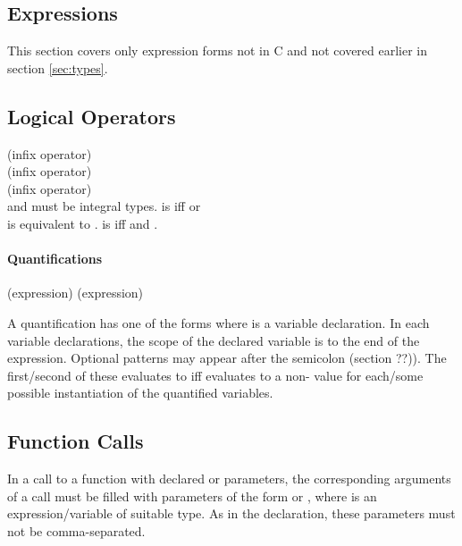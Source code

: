 \documentclass[preprint,nocopyrightspace]{sigplanconf}
\newcommand{\subsubsubsection}[1]{\paragraph{#1}}
\begin{document}
{{{{\begin{VCC}
\section{Expressions}
This section covers only expression forms not in C and not covered
earlier in section \ref{sec:types}.

\subsection{Logical Operators}

 (infix operator) \\
 (infix operator)\\
 (infix operator)\\
 and  must be integral types. 
 is \vcc{\true} iff  or \\
 is equivalent to .
 is \vcc{\true} iff  and .

\subsubsubsection{Quantifications}

 (expression)
 (expression)

A quantification has one of the forms
where  is a variable declaration. In each variable
declarations, the scope of the declared variable is to the end of the
expression. Optional patterns may appear after the semicolon
(section ??)). 
The first/second of these evaluates to 
\vcc{\true} iff  evaluates to a non-\vcc{\false} value for
each/some possible instantiation of the quantified variables.

\subsection{Function Calls}
In a call to a function with declared  or 
parameters, the corresponding arguments of a call must be filled with
parameters of the form  or ,
where  is an expression/variable of suitable type. As in the
declaration, these parameters must not be comma-separated.




\end{VCC}}}}}
\end{document}
